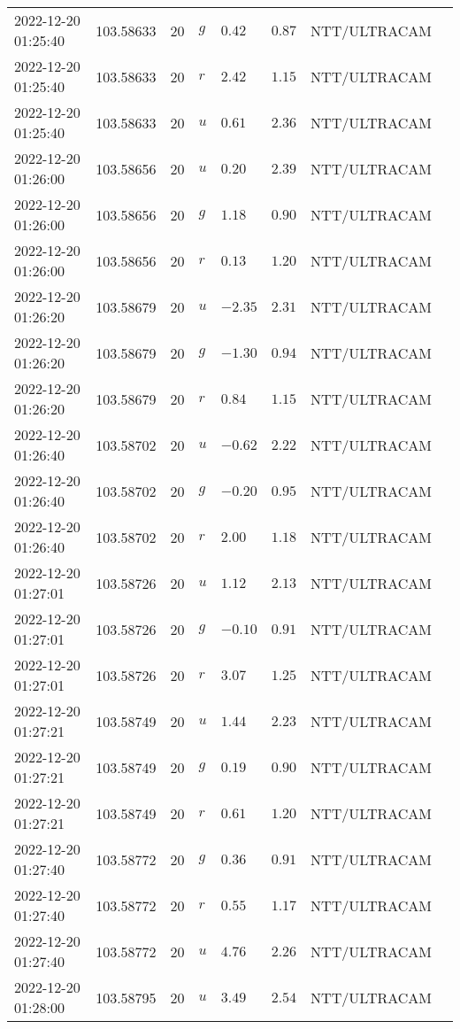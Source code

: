 \documentclass{nature_plusfigure}
\begin{document}
\begin{supplement}
\begin{center}
\begin{longtable}{llllllll}
2022-12-20 01:25:40 & 103.58633 & 20 & $g$ & $0.42$ & $0.87$ & NTT/ULTRACAM &  \\ 
2022-12-20 01:25:40 & 103.58633 & 20 & $r$ & $2.42$ & $1.15$ & NTT/ULTRACAM &  \\ 
2022-12-20 01:25:40 & 103.58633 & 20 & $u$ & $0.61$ & $2.36$ & NTT/ULTRACAM &  \\ 
2022-12-20 01:26:00 & 103.58656 & 20 & $u$ & $0.20$ & $2.39$ & NTT/ULTRACAM &  \\ 
2022-12-20 01:26:00 & 103.58656 & 20 & $g$ & $1.18$ & $0.90$ & NTT/ULTRACAM &  \\ 
2022-12-20 01:26:00 & 103.58656 & 20 & $r$ & $0.13$ & $1.20$ & NTT/ULTRACAM &  \\ 
2022-12-20 01:26:20 & 103.58679 & 20 & $u$ & $-2.35$ & $2.31$ & NTT/ULTRACAM &  \\ 
2022-12-20 01:26:20 & 103.58679 & 20 & $g$ & $-1.30$ & $0.94$ & NTT/ULTRACAM &  \\ 
2022-12-20 01:26:20 & 103.58679 & 20 & $r$ & $0.84$ & $1.15$ & NTT/ULTRACAM &  \\ 
2022-12-20 01:26:40 & 103.58702 & 20 & $u$ & $-0.62$ & $2.22$ & NTT/ULTRACAM &  \\ 
2022-12-20 01:26:40 & 103.58702 & 20 & $g$ & $-0.20$ & $0.95$ & NTT/ULTRACAM &  \\ 
2022-12-20 01:26:40 & 103.58702 & 20 & $r$ & $2.00$ & $1.18$ & NTT/ULTRACAM &  \\ 
2022-12-20 01:27:01 & 103.58726 & 20 & $u$ & $1.12$ & $2.13$ & NTT/ULTRACAM &  \\ 
2022-12-20 01:27:01 & 103.58726 & 20 & $g$ & $-0.10$ & $0.91$ & NTT/ULTRACAM &  \\ 
2022-12-20 01:27:01 & 103.58726 & 20 & $r$ & $3.07$ & $1.25$ & NTT/ULTRACAM &  \\ 
2022-12-20 01:27:21 & 103.58749 & 20 & $u$ & $1.44$ & $2.23$ & NTT/ULTRACAM &  \\ 
2022-12-20 01:27:21 & 103.58749 & 20 & $g$ & $0.19$ & $0.90$ & NTT/ULTRACAM &  \\ 
2022-12-20 01:27:21 & 103.58749 & 20 & $r$ & $0.61$ & $1.20$ & NTT/ULTRACAM &  \\ 
2022-12-20 01:27:40 & 103.58772 & 20 & $g$ & $0.36$ & $0.91$ & NTT/ULTRACAM &  \\ 
2022-12-20 01:27:40 & 103.58772 & 20 & $r$ & $0.55$ & $1.17$ & NTT/ULTRACAM &  \\ 
2022-12-20 01:27:40 & 103.58772 & 20 & $u$ & $4.76$ & $2.26$ & NTT/ULTRACAM &  \\ 
2022-12-20 01:28:00 & 103.58795 & 20 & $u$ & $3.49$ & $2.54$ & NTT/ULTRACAM &  \\ 

\end{longtable}
\end{center}
\end{supplement}
\end{document}
